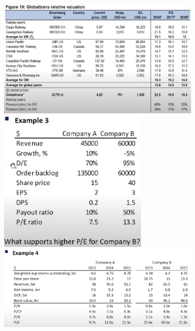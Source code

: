 \documentclass{article}
\begin{document}
\begin{center}
\includegraphics[width=0.75\textwidth]{Relative_valuation.png}\\
\includegraphics[width=0.55\textwidth]{Example_3.png}\\
\includegraphics[width=0.75\textwidth]{Example_4.png}\\
\end{center}
\end{document}
